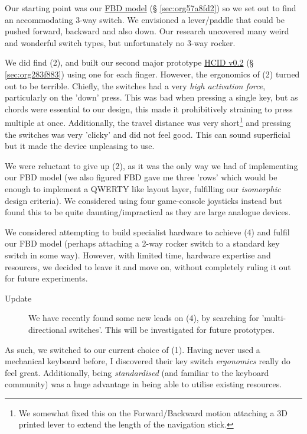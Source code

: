 \documentclass[logo,bsc,singlespacing,parskip]{infthesis}
\begin{document}
Our starting point was our \hyperref[sec:org57a8fd2]{FBD model} (§ \ref{sec:org57a8fd2}) so we set out to find an accommodating 3-way switch.
We envisioned a lever/paddle that could be pushed forward, backward and also down.
Our research uncovered many weird and wonderful switch types, but unfortunately no 3-way rocker.

We did find (2), and built our second major prototype \hyperref[sec:org283f883]{HCID v0.2} (§ \ref{sec:org283f883}) using one for each finger.
However, the ergonomics of (2) turned out to be terrible.
Chiefly, the switches had a very \emph{high activation force}, particularly on the 'down' press.
This was bad  when pressing a single key, but as chords were essential to our design, this made it prohibitively straining to press multiple at once.
Additionally, the travel distance was very short\footnote{We somewhat fixed this on the Forward/Backward motion attaching a 3D printed lever to extend the length of the navigation stick.} and pressing the switches was very 'clicky' and did not feel good.
This can sound superficial but it made the device unpleasing to use.

We were reluctant to give up (2), as it was the only way we had of implementing our FBD model (we also figured FBD gave me three 'rows' which would be enough to implement a QWERTY like layout layer, fulfilling our \emph{isomorphic} design criteria).
We considered using four game-console joysticks instead but found this to be quite daunting/impractical as they are large analogue devices.

We considered attempting to build specialist hardware to achieve (4) and fulfil our FBD model (perhaps attaching a 2-way rocker switch to a standard key switch in some way).
However, with limited time, hardware expertise and resources, we decided to leave it and move on, without completely ruling it out for future experiments. \\

\begin{mdframed}
\begin{description}
\item[{Update}] We have recently found some new leads on (4), by searching for 'multi-directional switches'.
This will be investigated for future prototypes.
\end{description}
\end{mdframed}


As such, we switched to our current choice of (1).
Having never used a mechanical keyboard before, I discovered their key switch \emph{ergonomics} really do feel great.
Additionally, being \emph{standardised} (and familiar to the keyboard community) was a huge advantage in being able to utilise existing resources.
\end{document}
